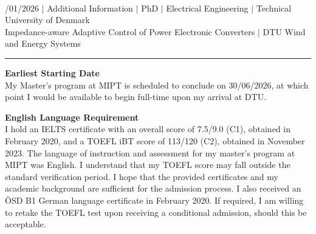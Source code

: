 \documentclass[a4paper,12pt]{article}
\begin{document}
{\centering
  {\scshape {}} \\ 
  {\fontsize{10}{10}/01/2026} $|$
  {\fontsize{10}{10}\selectfont Additional Information} $|$
  {\fontsize{10}{10}\selectfont PhD} $|$
  {\fontsize{10}{10}\selectfont Electrical Engineering} $|$
  {\fontsize{10}{10}\selectfont Technical University of Denmark} \\
  {\fontsize{10}{10}\selectfont Impedance-aware Adaptive Control of Power
  Electronic Converters} $|$
  {\fontsize{10}{10}\selectfont DTU Wind and Energy Systems}
\par}
\vspace{-15pt}
\noindent\rule{\textwidth}{0.5pt}

\vspace{-10pt}

\noindent \textbf{Earliest Starting Date}\\
My Master's program at MIPT is scheduled to conclude on 30/06/2026, at which point I would be available to begin full-time upon my arrival at DTU.

\noindent \textbf{English Language Requirement}\\
I hold an IELTS certificate with an overall score of 7.5/9.0 (C1), obtained in February 2020, and a TOEFL iBT score of 113/120 (C2), obtained in November 2023. The language of instruction and assessment for my master's program at MIPT was English. I understand that my TOEFL score may fall outside the standard verification period. I hope that the provided certificates and my academic background are sufficient for the admission process. I also received an ÖSD B1 German language certificate in February 2020. If required, I am willing to retake the TOEFL test upon receiving a conditional admission, should this be acceptable.
\end{document}
